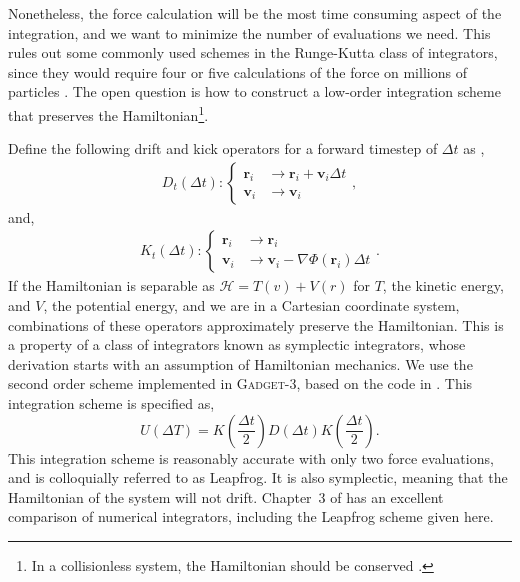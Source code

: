 Nonetheless, the force calculation will be the most time consuming aspect of the integration, and we want to minimize the number of evaluations we need. This rules out some commonly used schemes in the Runge-Kutta class of integrators, since they would require four or five calculations of the force on millions of particles \citep{numerical_recipes_fortran}. The open question is how to construct a low-order integration scheme that preserves the Hamiltonian\footnote{In a collisionless system, the Hamiltonian should be conserved \citep{BT}.}.

Define the following drift and kick operators for a forward timestep of $\Delta t$ as \citep{quinn_1997},
\begin{eqnarray}
D_t(\Delta t) : \begin{cases} 
	  \textbf{r}_i & \longrightarrow  \textbf{r}_i + \textbf{v}_i \Delta t\\
      \textbf{v}_i & \longrightarrow  \textbf{v}_i 
   \end{cases},
\end{eqnarray}
and,
\begin{eqnarray}
K_t(\Delta t) : \begin{cases} 
	  \textbf{r}_i & \longrightarrow  \textbf{r}_i\\
      \textbf{v}_i & \longrightarrow  \textbf{v}_i  - \nabla \Phi(\textbf{r}_i) \Delta t
   \end{cases}.
\end{eqnarray}
If the Hamiltonian is separable as $\mathcal{H} = T(v) + V(r)$ for $T$, the kinetic energy, and  $V$, the potential energy, and we are in a Cartesian coordinate system, combinations of these operators approximately preserve the Hamiltonian. This is a property of a class of integrators known as symplectic integrators, whose derivation starts with an assumption of Hamiltonian mechanics. We use the second order scheme implemented in \textsc{Gadget-3}, based on the code in \citet{GadgetCodePaper}. This integration scheme is specified as,
\begin{equation}
U(\Delta T) = K(\frac{\Delta t}{2}) D(\Delta t) K(\frac{\Delta t}{2}).
\end{equation}
This integration scheme is reasonably accurate with only two force evaluations, and is colloquially referred to as Leapfrog. It is also symplectic, meaning that the Hamiltonian of the system will not drift. Chapter~3 of \citet{BT} has an excellent comparison of numerical integrators, including the Leapfrog scheme given here.

